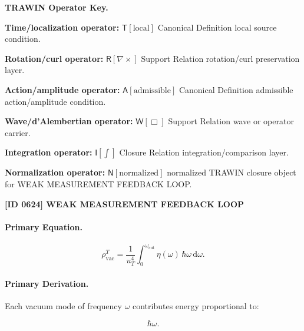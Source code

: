 \par\vspace{0.45\baselineskip}
\noindent\begin{minipage}[t]{\linewidth}
\begingroup
\small
\raggedright
\textbf{TRAWIN Operator Key.}\par
\noindent\textbf{Time/localization operator:} $\mathsf{T}\!\left[\mathrm{local}\right]$ Canonical Definition local source condition.\par
\noindent\textbf{Rotation/curl operator:} $\mathsf{R}\!\left[\nabla\times\right]$ Support Relation rotation/curl preservation layer.\par
\noindent\textbf{Action/amplitude operator:} $\mathsf{A}\!\left[\mathrm{admissible}\right]$ Canonical Definition admissible action/amplitude condition.\par
\noindent\textbf{Wave/d'Alembertian operator:} $\mathsf{W}\!\left[\Box\right]$ Support Relation wave or operator carrier.\par
\noindent\textbf{Integration operator:} $\mathsf{I}\!\left[\int\right]$ Closure Relation integration/comparison layer.\par
\noindent\textbf{Normalization operator:} $\mathsf{N}\!\left[\mathrm{normalized}\right]$ normalized TRAWIN closure object for WEAK MEASUREMENT FEEDBACK LOOP.\par
\endgroup
\end{minipage}

\clearpage
\noindent\textbf{[ID 0624] WEAK MEASUREMENT FEEDBACK LOOP}\par
\vspace{0.35em}
\paragraph{Primary Equation.}
\begin{equation}
\rho_{\mathrm{vac}}^{T}
=
\frac{1}{u_T^4}
\int_{0}^{\omega_{\mathrm{cut}}}
\eta(\omega)\,
\hbar\omega\,
\mathrm{d}\omega .
\end{equation}

\paragraph{Primary Derivation.}
Each vacuum mode of frequency $\omega$ contributes energy proportional to:

\begin{equation}
\hbar\omega .
\end{equation}

